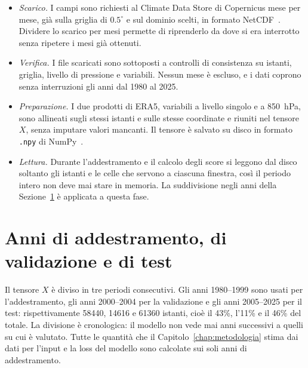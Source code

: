 \begin{itemize}
    \item \emph{Scarico.} I campi sono richiesti al Climate Data Store di Copernicus mese per mese, già sulla griglia di $0.5^\circ$ e sul dominio scelti, in formato NetCDF~\cite{rew1990netcdf}. Dividere lo scarico per mesi permette di riprenderlo da dove si era interrotto senza ripetere i mesi già ottenuti.
    \item \emph{Verifica.} I file scaricati sono sottoposti a controlli di consistenza su istanti, griglia, livello di pressione e variabili. Nessun mese è escluso, e i dati coprono senza interruzioni gli anni dal 1980 al 2025.
    \item \emph{Preparazione.} I due prodotti di ERA5, variabili a livello singolo e a 850~hPa, sono allineati sugli stessi istanti e sulle stesse coordinate e riuniti nel tensore $X$, senza imputare valori mancanti. Il tensore è salvato su disco in formato \texttt{.npy} di NumPy~\cite{harris2020numpy}.
    \item \emph{Lettura.} Durante l'addestramento e il calcolo degli score si leggono dal disco soltanto gli istanti e le celle che servono a ciascuna finestra, così il periodo intero non deve mai stare in memoria. La suddivisione negli anni della Sezione~\ref{sec:dati-split} è applicata a questa fase.
\end{itemize}

\section{Anni di addestramento, di validazione e di test}
\label{sec:dati-split}

Il tensore $X$ è diviso in tre periodi consecutivi. Gli anni 1980--1999 sono usati per l'addestramento, gli anni 2000--2004 per la validazione e gli anni 2005--2025 per il test: rispettivamente 58440, 14616 e 61360 istanti, cioè il 43\%, l'11\% e il 46\% del totale. La divisione è cronologica: il modello non vede mai anni successivi a quelli su cui è valutato. Tutte le quantità che il Capitolo~\ref{chap:metodologia} stima dai dati per l'input e la loss del modello sono calcolate sui soli anni di addestramento.

